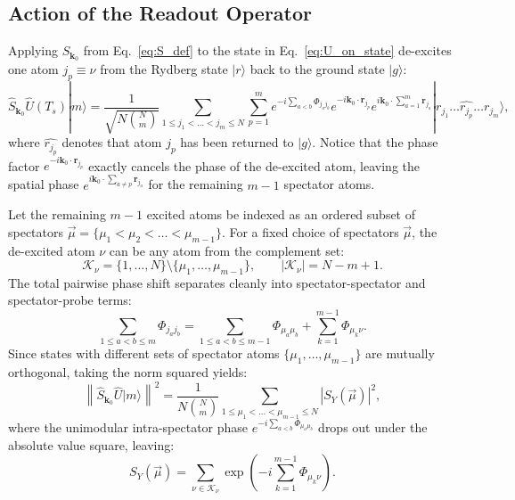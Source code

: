 \documentclass[11pt,a4paper]{article}
\begin{document}
\subsection{Action of the Readout Operator}
Applying $\hat{S}_{\mathbf{k}_0}$ from Eq.~\eqref{eq:S_def} to the state in Eq.~\eqref{eq:U_on_state} de-excites one atom $j_p \equiv \nu$ from the Rydberg state $|r\rangle$ back to the ground state $|g\rangle$:
\begin{equation}
    \hat{S}_{\mathbf{k}_0} \hat{U}(T_s) | m \rangle = \frac{1}{\sqrt{N \binom{N}{m}}} \sum_{1 \le j_1 < \dots < j_m \le N} \sum_{p=1}^m e^{-i \sum_{a < b} \Phi_{j_a j_b}} e^{-i \mathbf{k}_0 \cdot \mathbf{r}_{j_p}} e^{i \mathbf{k}_0 \cdot \sum_{a=1}^m \mathbf{r}_{j_a}} |r_{j_1} \dots \widehat{r_{j_p}} \dots r_{j_m} \rangle,
\end{equation}
where $\widehat{r_{j_p}}$ denotes that atom $j_p$ has been returned to $|g\rangle$. Notice that the phase factor $e^{-i \mathbf{k}_0 \cdot \mathbf{r}_{j_p}}$ exactly cancels the phase of the de-excited atom, leaving the spatial phase $e^{i \mathbf{k}_0 \cdot \sum_{a \ne p} \mathbf{r}_{j_a}}$ for the remaining $m - 1$ spectator atoms.

Let the remaining $m - 1$ excited atoms be indexed as an ordered subset of spectators $\vec{\mu} = \{\mu_1 < \mu_2 < \dots < \mu_{m-1}\}$. For a fixed choice of spectators $\vec{\mu}$, the de-excited atom $\nu$ can be any atom from the complement set:
\begin{equation}
    \mathcal{K}_\nu = \{1, \dots, N\} \setminus \{\mu_1, \dots, \mu_{m-1}\}, \qquad |\mathcal{K}_\nu| = N - m + 1.
\end{equation}
The total pairwise phase shift separates cleanly into spectator-spectator and spectator-probe terms:
\begin{equation}
    \sum_{1 \le a < b \le m} \Phi_{j_a j_b} = \sum_{1 \le a < b \le m-1} \Phi_{\mu_a \mu_b} + \sum_{k=1}^{m-1} \Phi_{\mu_k \nu}.
\end{equation}
Since states with different sets of spectator atoms $\{\mu_1, \dots, \mu_{m-1}\}$ are mutually orthogonal, taking the norm squared yields:
\begin{equation}
    \left\| \hat{S}_{\mathbf{k}_0} \hat{U} | m \rangle \right\|^2 = \frac{1}{N \binom{N}{m}} \sum_{1 \le \mu_1 < \dots < \mu_{m-1} \le N} |S_Y(\vec{\mu})|^2,
\end{equation}
where the unimodular intra-spectator phase $e^{-i \sum_{a<b} \Phi_{\mu_a \mu_b}}$ drops out under the absolute value square, leaving:
\begin{equation}
    S_Y(\vec{\mu}) = \sum_{\nu \in \mathcal{K}_\nu} \exp\left( -i \sum_{k=1}^{m-1} \Phi_{\mu_k \nu} \right).
    \label{eq:SY_def}
\end{equation}
\end{document}
